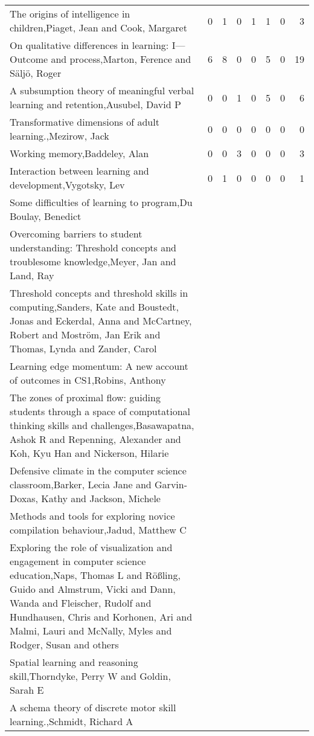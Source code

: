 \begin{table*}[t]
\begin{tabular}{lp{2cm}p{2cm}p{2cm}p{2cm}p{2cm}p{2cm}r}
The origins of intelligence in children,Piaget, Jean and Cook, Margaret & 0 & 1 & 0 & 1 & 1 & 0 & 3\\
On qualitative differences in learning: I—Outcome and process,Marton, Ference and S{\"a}lj{\"o}, Roger & 6 & 8 & 0 & 0 & 5 & 0 & 19\\
A subsumption theory of meaningful verbal learning and retention,Ausubel, David P & 0 & 0 & 1 & 0 & 5 & 0 & 6\\
Transformative dimensions of adult learning.,Mezirow, Jack & 0 & 0 & 0 & 0 & 0 & 0 & 0\\
Working memory,Baddeley, Alan & 0 & 0 & 3 & 0 & 0 & 0 & 3\\
Interaction between learning and development,Vygotsky, Lev & 0 & 1 & 0 & 0 & 0 & 0 & 1\\
Some difficulties of learning to program,Du Boulay, Benedict &  &  &  &  &  &  & \\
Overcoming barriers to student understanding: Threshold concepts and troublesome knowledge,Meyer, Jan and Land, Ray &  &  &  &  &  &  & \\
Threshold concepts and threshold skills in computing,Sanders, Kate and Boustedt, Jonas and Eckerdal, Anna and McCartney, Robert and Mostr{\"o}m, Jan Erik and Thomas, Lynda and Zander, Carol &  &  &  &  &  &  & \\
Learning edge momentum: A new account of outcomes in CS1,Robins, Anthony &  &  &  &  &  &  & \\
The zones of proximal flow: guiding students through a space of computational thinking skills and challenges,Basawapatna, Ashok R and Repenning, Alexander and Koh, Kyu Han and Nickerson, Hilarie &  &  &  &  &  &  & \\
Defensive climate in the computer science classroom,Barker, Lecia Jane and Garvin-Doxas, Kathy and Jackson, Michele &  &  &  &  &  &  & \\
Methods and tools for exploring novice compilation behaviour,Jadud, Matthew C &  &  &  &  &  &  & \\
Exploring the role of visualization and engagement in computer science education,Naps, Thomas L and R{\"o}{\ss}ling, Guido and Almstrum, Vicki and Dann, Wanda and Fleischer, Rudolf and Hundhausen, Chris and Korhonen, Ari and Malmi, Lauri and McNally, Myles and Rodger, Susan and others &  &  &  &  &  &  & \\
Spatial learning and reasoning skill,Thorndyke, Perry W and Goldin, Sarah E &  &  &  &  &  &  & \\
A schema theory of discrete motor skill learning.,Schmidt, Richard A &  &  &  &  &  &  & \\

\end{tabular}
\end{table*}
